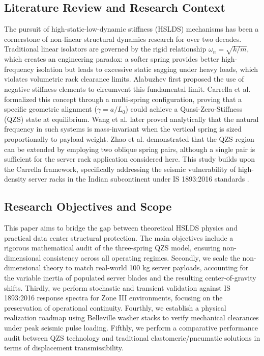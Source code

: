 \documentclass[preprint,12pt]{article}
\begin{document}
\subsection{Literature Review and Research Context}
The pursuit of high-static-low-dynamic stiffness (HSLDS) mechanisms has been a cornerstone of non-linear structural dynamics research for over two decades. Traditional linear isolators are governed by the rigid relationship $\omega_n = \sqrt{k/m}$, which creates an engineering paradox: a softer spring provides better high-frequency isolation but leads to excessive static sagging under heavy loads, which violates volumetric rack clearance limits. Alabuzhev \cite{alabuzhev1989vibration} first proposed the use of negative stiffness elements to circumvent this fundamental limit. Carrella et al. \cite{carrella2007static} formalized this concept through a multi-spring configuration, proving that a specific geometric alignment ($\gamma = a/L_0$) could achieve a Quasi-Zero-Stiffness (QZS) state at equilibrium. Wang et al. \cite{wang2018mass} later proved analytically that the natural frequency in such systems is mass-invariant when the vertical spring is sized proportionally to payload weight. Zhao et al. \cite{zhao2020qzs} demonstrated that the QZS region can be extended by employing two oblique spring pairs, although a single pair is sufficient for the server rack application considered here. This study builds upon the Carrella framework, specifically addressing the seismic vulnerability of high-density server racks in the Indian subcontinent under IS 1893:2016 standards \cite{is1893}.

\subsection{Research Objectives and Scope}
This paper aims to bridge the gap between theoretical HSLDS physics and practical data center structural protection. The main objectives include a rigorous mathematical audit of the three-spring QZS model, ensuring non-dimensional consistency across all operating regimes. Secondly, we scale the non-dimensional theory to match real-world 100 kg server payloads, accounting for the variable inertia of populated server blades and the resulting center-of-gravity shifts. Thirdly, we perform stochastic and transient validation against IS 1893:2016 response spectra for Zone III environments, focusing on the preservation of operational continuity. Fourthly, we establish a physical realization roadmap using Belleville washer stacks to verify mechanical clearances under peak seismic pulse loading. Fifthly, we perform a comparative performance audit between QZS technology and traditional elastomeric/pneumatic solutions in terms of displacement transmissibility.
\end{document}
